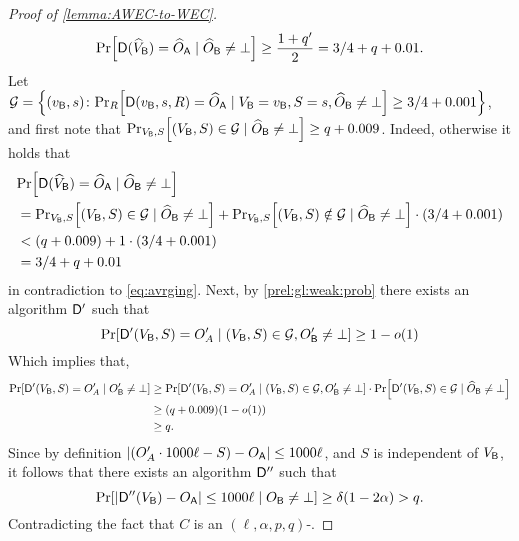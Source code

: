 \begin{proof}[Proof of \cref{lemma:AWEC-to-WEC}]
\begin{align}\label{eq:avrging}
\pr{\Dc(\hVB)=\hOA  \mid \hOB\neq\bot} \ge\frac{1+q'}{2}=  3/4+q+0.01.
\end{align}
Let $\cG=\set{(\vB,s)\colon \ppr{R}{\Dc(\vB,s,R)=\hOA\mid\VB=\vB,S=s,\hOB\neq \bot}\ge 3/4+0.001}$, and first note that $\ppr{\VB,S}{(\VB,S)\in \cG\mid \hOB\neq \bot}\ge q+0.009$.
Indeed, otherwise it holds that
\begin{align*}
&\pr{\Dc(\hVB)=\hOA  \mid \hOB\neq\bot}\\
& = \ppr{\VB,S}{(\VB,S)\in \cG\mid \hOB\neq \bot} + \ppr{\VB,S}{(\VB,S)\notin \cG\mid \hOB\neq \bot}\cdot(3/4+ 0.001)\\
&< (q+0.009) + 1\cdot (3/4+ 0.001)\\
&= 3/4+ q+0.01
\end{align*}
in contradiction to \cref{eq:avrging}.
    Next, by \cref{prel:gl:weak:prob} there exists an algorithm $\mathsf{D}'$ such that 
    $$
    \pr{\Dc'(\VB,S)=O'_A \mid (\VB,S)\in\cG, \OB'\neq \bot}\ge 1-o(1)
    $$ 
    Which implies that, 
    \begin{align*}
    \pr{\Dc'(\VB,S)=O'_A \mid  \OB'\neq \bot}
    &\ge \pr{\Dc'(\VB,S)=O'_A \mid (\VB,S)\in\cG, \OB'\neq \bot}\cdot \pr{\Dc'(\VB,S)\in\cG \mid\hOB\neq \bot}\\
    &\ge (q+0.009)(1-o(1))\\
    &\ge q.
    \end{align*}
    Since by definition $\size{(O'_A\cdot 1000\ell-S)-\OA}\le 1000\ell$, and $S$ is independent of ${V_{\mathsf{B}}}$, it follows that there exists an algorithm $\mathsf{D}''$ such that  
    $$\pr{\size{\Dc''(\VB)-\OA}\le 1000\ell\mid \OB\neq \bot}\ge \delta(1-2\alpha)> q.$$
Contradicting the fact that $C$ is an $(\ell,\alpha,p,q)$-\AWEC.
\end{proof}